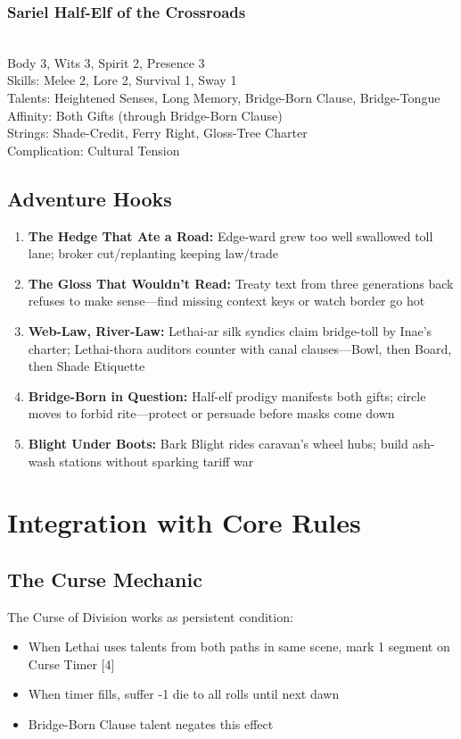 \documentclass[11pt]{book}
\begin{document}
\subsubsection*{Sariel Half-Elf of the Crossroads} \\
Body 3, Wits 3, Spirit 2, Presence 3 \\
Skills: Melee 2, Lore 2, Survival 1, Sway 1 \\
Talents: Heightened Senses, Long Memory, Bridge-Born Clause, Bridge-Tongue \\
Affinity: Both Gifts (through Bridge-Born Clause) \\
Strings: Shade-Credit, Ferry Right, Gloss-Tree Charter \\
Complication: Cultural Tension

\subsection{Adventure Hooks}
\begin{enumerate}
    \item \textbf{The Hedge That Ate a Road:} Edge-ward grew too well swallowed toll lane; broker cut/replanting keeping law/trade
    \item \textbf{The Gloss That Wouldn't Read:} Treaty text from three generations back refuses to make sense---find missing context keys or watch border go hot
    \item \textbf{Web-Law, River-Law:} Lethai-ar silk syndics claim bridge-toll by Inae's charter; Lethai-thora auditors counter with canal clauses---Bowl, then Board, then Shade Etiquette
    \item \textbf{Bridge-Born in Question:} Half-elf prodigy manifests both gifts; circle moves to forbid rite---protect or persuade before masks come down
    \item \textbf{Blight Under Boots:} Bark Blight rides caravan's wheel hubs; build ash-wash stations without sparking tariff war
\end{enumerate}

\section{Integration with Core Rules}
\subsection*{The Curse Mechanic}
The Curse of Division works as persistent condition: \\
\begin{itemize}
    \item When Lethai uses talents from both paths in same scene, mark 1 segment on Curse Timer [4]
    \item When timer fills, suffer -1 die to all rolls until next dawn
    \item Bridge-Born Clause talent negates this effect
\end{itemize}
\end{document}
